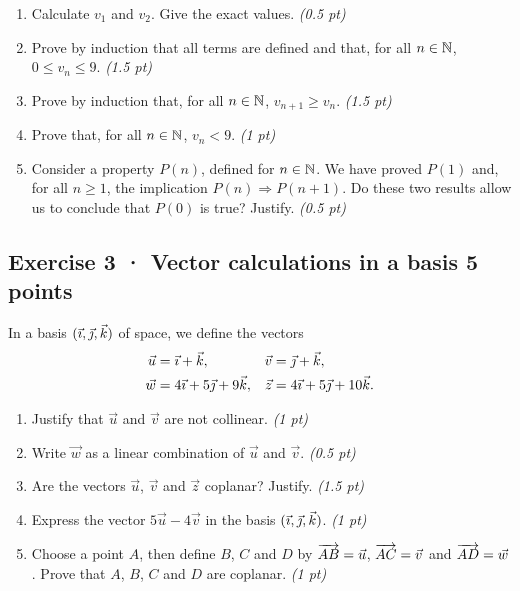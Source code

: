 \begin{enumerate}

\item Calculate $v_1$ and $v_2$. Give the exact values. \hfill\textit{(0.5 pt)}

\item Prove by induction that all terms are defined and that, for all $n\in\mathbb N$, $0\le v_n\le9$. \hfill\textit{(1.5 pt)}

\item Prove by induction that, for all $n\in\mathbb N$, $v_{n+1}\ge v_n$. \hfill\textit{(1.5 pt)}

\item Prove that, for all $n\in\mathbb N$, $v_n<9$. \hfill\textit{(1 pt)}

\item Consider a property $P(n)$, defined for $n\in\mathbb N$. We have proved $P(1)$ and, for all $n\ge1$, the implication $P(n)\Rightarrow P(n+1)$. Do these two results allow us to conclude that $P(0)$ is true? Justify. \hfill\textit{(0.5 pt)}

\end{enumerate}

\clearpage{}\par

\subsection*{Exercise 3 · Vector calculations in a basis \hfill 5 points}In a basis $(\vec{\imath},\vec{\jmath},\vec k)$ of space, we define the vectors
\[\begin{aligned}\vec u&=\vec{\imath}+\vec k,&\vec v&=\vec{\jmath}+\vec k,\\
\vec w&=4\vec{\imath}+5\vec{\jmath}+9\vec k,&\vec z&=4\vec{\imath}+5\vec{\jmath}+10\vec k.\end{aligned}\]

\begin{enumerate}

\item Justify that $\vec u$ and $\vec v$ are not collinear. \hfill\textit{(1 pt)}

\item Write $\vec w$ as a linear combination of $\vec u$ and $\vec v$. \hfill\textit{(0.5 pt)}

\item Are the vectors $\vec u$, $\vec v$ and $\vec z$ coplanar? Justify. \hfill\textit{(1.5 pt)}

\item Express the vector $5\vec u-4\vec v$ in the basis $(\vec{\imath},\vec{\jmath},\vec k)$. \hfill\textit{(1 pt)}

\item Choose a point $A$, then define $B$, $C$ and $D$ by $\overrightarrow{AB}=\vec u$, $\overrightarrow{AC}=\vec v$ and $\overrightarrow{AD}=\vec w$. Prove that $A$, $B$, $C$ and $D$ are coplanar. \hfill\textit{(1 pt)}

\end{enumerate}

